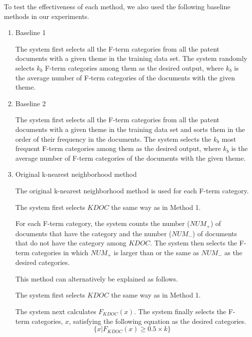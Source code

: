 \documentclass[english]{jnlp_1.2c}
\begin{document}
To test the effectiveness of each method, 
we also used the following baseline methods in our experiments.
\begin{enumerate}
\item 
  Baseline 1

  The system first selects 
  all the F-term categories 
  from all the patent documents with a given theme in the training data set.
  The system randomly selects $k_b$ F-term categories among them as the desired output, where 
  $k_b$ is the average number of F-term categories 
  of the documents with the given theme.

\item 
  Baseline 2

  The system first selects 
  all the F-term categories 
  from all the patent documents with a given theme in the training data set
  and sorts them 
  in the order of their frequency in the documents. 
  The system selects the $k_b$ most frequent F-term categories among them as the desired output, where 
  $k_b$ is the average number of F-term categories 
  of the documents with the given theme.

\item 
  Original k-nearest neighborhood method \cite{Fukunaga,Okamoto97B_2,Yang-sigir99_2,Pattern_class,Guo2004_2}

  The original k-nearest neighborhood method is used 
  for each F-term category. 

  The system first selects $KDOC$ the same way as in Method 1.
 
  For each F-term category, 
  the system counts the number ($NUM_+$) of documents that have the category
  and the number ($NUM_-$) of documents that do not have the category
  among $KDOC$. 
  The system then selects the F-term categories 
  in which $NUM_+$ 
  is larger than or the same as $NUM_-$
  as the desired categories. 
        
  This method can alternatively be explained as follows.

  The system first selects $KDOC$ the same way as in Method 1.
  
The system next calculates $F_{KDOC}(x)$. 
The system finally selects the 
F-term categories, $x$, satisfying the following equation as the desired categories. 
\begin{equation}
\{x| F_{KDOC}(x) \geq 0.5 \times k\}
\end{equation}

\end{enumerate}
\end{document}
